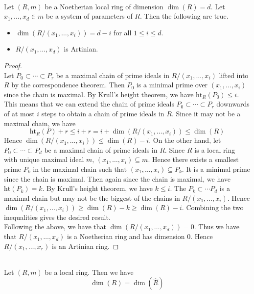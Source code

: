 \documentclass[a4paper]{article}
\begin{document}
\begin{prp}{}{}\\
Let $(R,m)$ be a Noetherian local ring of dimension $\dim(R)=d$. Let $x_1,\dots,x_d\in m$ be a system of parameters of $R$. Then the following are true. 
\begin{itemize}
\item $\dim(R/(x_1,\dots,x_i))=d-i$ for all $1\leq i\leq d$. 
\item $R/(x_1,\dots,x_d)$ is Artinian. 
\end{itemize}
\begin{proof}\\
Let $P_0\subset\cdots\subset P_r$ be a maximal chain of prime ideals in $R/(x_1,\dots,x_i)$ lifted into $R$ by the correspondence theorem. Then $P_0$ is a minimal prime over $(x_1,\dots,x_i)$ since the chain is maximal. By Krull's height theorem, we have $\text{ht}_R(P_0)\leq i$. This means that we can extend the chain of prime ideals $P_0\subset\cdots\subset P_r$ downwards of at most $i$ steps to obtain a chain of prime ideals in $R$. Since it may not be a maximal chain, we have $$\text{ht}_R(P)+r\leq i+r=i+\dim(R/(x_1,\dots,x_i))\leq\dim(R)$$ Hence $\dim(R/(x_1,\dots,x_i))\leq\dim(R)-i$. On the other hand, let $P_0\subset\cdots\subset P_d$ be a maximal chain of prime ideals in $R$. Since $R$ is a local ring with unique maximal ideal $m$, $(x_1,\dots,x_i)\subseteq m$. Hence there exists a smallest prime $P_k$ in the maximal chain such that $(x_1,\dots,x_i)\subseteq P_k$. It is a minimal prime since the chain is maximal. Then again since the chain is maximal, we have $\text{ht}(P_k)=k$. By Krull's height theorem, we have $k\leq i$. The $P_k\subset\cdots P_d$ is a maximal chain but may not be the biggest of the chains in $R/(x_1,\dots,x_i)$. Hence $\dim(R/(x_1,\dots,x_i))\geq\dim(R)-k\geq\dim(R)-i$. Combining the two inequalities gives the desired result. \\

Following the above, we have that $\dim(R/(x_1,\dots,x_d))=0$. Thus we have that $R/(x_1,\dots,x_d)$ is a Noetherian ring and has dimension $0$. Hence $R/(x_1,\dots,x_r)$ is an Artinian ring. 
\end{proof}
\end{prp}

\begin{prp}{}{}\\
Let $(R,m)$ be a local ring. Then we have $$\dim(R)=\dim(\widehat{R})$$
\end{prp}

\pagebreak
\end{document}

